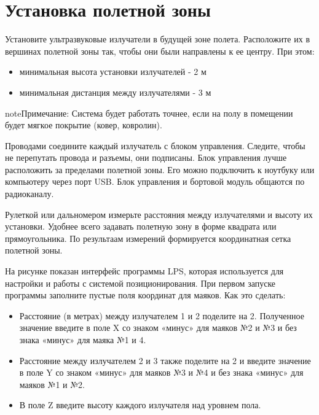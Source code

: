 \documentclass[a4paper,10pt,russian]{sphinxmanual}
\begin{document}
\section{Установка полетной зоны}
\label{\detokenize{indoor_nav:id3}}

Установите ультразвуковые излучатели в будущей зоне полета. Расположите их в вершинах полетной зоны так, чтобы они были направлены к ее центру. При этом:
\begin{itemize}
\item {} 
минимальная высота установки излучателей - 2 м

\item {} 
минимальная дистанция между излучателями  - 3 м

\end{itemize}

\begin{sphinxadmonition}{note}{Примечание:}
Система будет работать точнее, если на полу в помещении будет мягкое покрытие (ковер, ковролин).
\end{sphinxadmonition}

Проводами соедините каждый излучатель с блоком управления. Следите, чтобы не перепутать провода и разъемы, они подписаны. Блок управления лучше расположить за пределами полетной зоны. Его можно подключить к ноутбуку или компьютеру через порт USB. Блок управления и бортовой модуль общаются по радиоканалу.

Рулеткой или дальномером измерьте расстояния между излучателями и высоту их установки. Удобнее всего задавать полетную зону в форме квадрата или прямоугольника. По результаам измерений формируется координатная сетка полетной зоны.


На рисунке показан интерфейс программы LPS, которая используется для настройки и работы с системой позиционирования. При первом запуске программы заполните пустые поля координат для маяков. Как это сделать:
\begin{itemize}
\item {} 
Расстояние (в метрах) между излучателем 1 и 2 поделите на 2. Полученное значение введите в поле X со знаком «минус» для маяков №2 и №3 и без знака «минус» для маяка №1 и 4.

\item {} 
Расстояние между излучателем 2 и 3 также поделите на 2 и введите значение в поле Y со знаком «минус» для маяков №3 и №4 и без знака «минус» для маяков №1 и №2.

\item {} 
В поле Z введите высоту каждого излучателя над уровнем пола.

\end{itemize}
\end{document}
